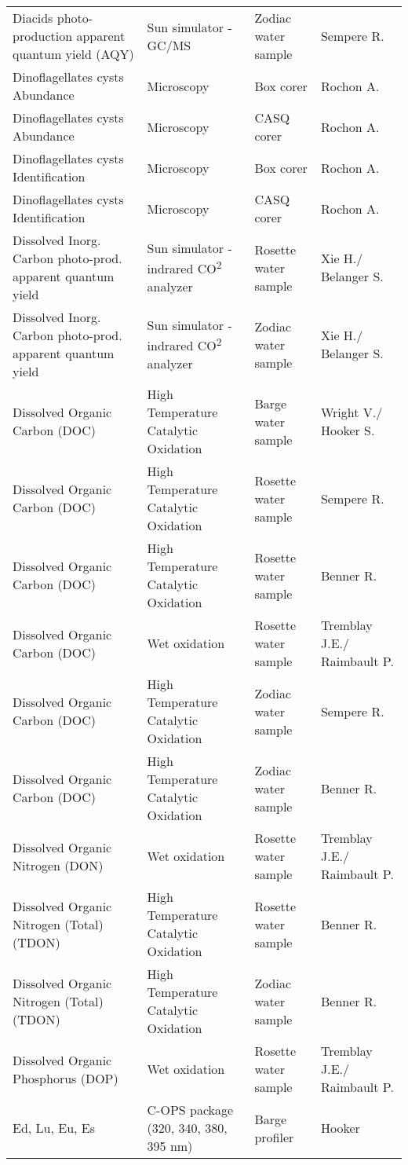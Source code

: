 \begin{longtable}[t]{llll}
Diacids photo-production apparent quantum yield (AQY) & Sun simulator - GC/MS & Zodiac water sample & Sempere R.\\
Dinoflagellates cysts Abundance & Microscopy & Box corer & Rochon A.\\
\addlinespace
Dinoflagellates cysts Abundance & Microscopy & CASQ corer & Rochon A.\\
Dinoflagellates cysts Identification & Microscopy & Box corer & Rochon A.\\
Dinoflagellates cysts Identification & Microscopy & CASQ corer & Rochon A.\\
Dissolved Inorg. Carbon photo-prod. apparent quantum yield & Sun simulator - indrared CO\textsuperscript{2} analyzer & Rosette water sample & Xie H./ Belanger S.\\
Dissolved Inorg. Carbon photo-prod. apparent quantum yield & Sun simulator - indrared CO\textsuperscript{2} analyzer & Zodiac water sample & Xie H./ Belanger S.\\
\addlinespace
Dissolved Organic Carbon (DOC) & High Temperature Catalytic Oxidation & Barge water sample & Wright V./ Hooker S.\\
Dissolved Organic Carbon (DOC) & High Temperature Catalytic Oxidation & Rosette water sample & Sempere R.\\
Dissolved Organic Carbon (DOC) & High Temperature Catalytic Oxidation & Rosette water sample & Benner R.\\
Dissolved Organic Carbon (DOC) & Wet oxidation & Rosette water sample & Tremblay J.E./ Raimbault P.\\
Dissolved Organic Carbon (DOC) & High Temperature Catalytic Oxidation & Zodiac water sample & Sempere R.\\
\addlinespace
Dissolved Organic Carbon (DOC) & High Temperature Catalytic Oxidation & Zodiac water sample & Benner R.\\
Dissolved Organic Nitrogen (DON) & Wet oxidation & Rosette water sample & Tremblay J.E./ Raimbault P.\\
Dissolved Organic Nitrogen (Total) (TDON) & High Temperature Catalytic Oxidation & Rosette water sample & Benner R.\\
Dissolved Organic Nitrogen (Total) (TDON) & High Temperature Catalytic Oxidation & Zodiac water sample & Benner R.\\
Dissolved Organic Phosphorus (DOP) & Wet oxidation & Rosette water sample & Tremblay J.E./ Raimbault P.\\
\addlinespace
Ed, Lu, Eu, Es & C-OPS package (320, 340, 380, 395 nm) & Barge profiler & Hooker\\

\end{longtable}
